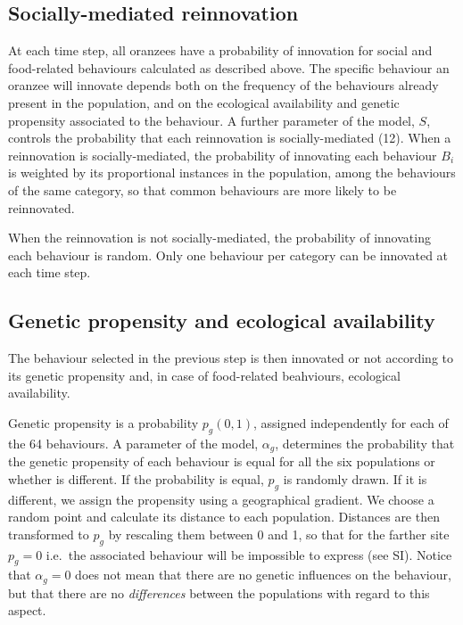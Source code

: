\documentclass[9pt,twocolumn,twoside,]{pnas-new}
\begin{document}
\subsection*{Socially-mediated reinnovation}\label{format}

At each time step, all oranzees have a probability of innovation for
social and food-related behaviours calculated as described above. The
specific behaviour an oranzee will innovate depends both on the
frequency of the behaviours already present in the population, and on
the ecological availability and genetic propensity associated to the
behaviour. A further parameter of the model, \(S\), controls the
probability that each reinnovation is socially-mediated (12). When a
reinnovation is socially-mediated, the probability of innovating each
behaviour \(B_i\) is weighted by its proportional instances in the
population, among the behaviours of the same category, so that common
behaviours are more likely to be reinnovated.

When the reinnovation is not socially-mediated, the probability of
innovating each behaviour is random. Only one behaviour per category can
be innovated at each time step.

\subsection*{Genetic propensity and ecological
availability}\label{format}

The behaviour selected in the previous step is then innovated or not
according to its genetic propensity and, in case of food-related
beahviours, ecological availability.

Genetic propensity is a probability \(p_g(0,1)\), assigned independently
for each of the 64 behaviours. A parameter of the model, \(\alpha_g\),
determines the probability that the genetic propensity of each behaviour
is equal for all the six populations or whether is different. If the
probability is equal, \(p_g\) is randomly drawn. If it is different, we
assign the propensity using a geographical gradient. We choose a random
point and calculate its distance to each population. Distances are then
transformed to \(p_g\) by rescaling them between 0 and 1, so that for
the farther site \(p_g=0\) i.e.~the associated behaviour will be
impossible to express (see SI). Notice that \(\alpha_g=0\) does not mean
that there are no genetic influences on the behaviour, but that there
are no \emph{differences} between the populations with regard to this
aspect.
\end{document}

